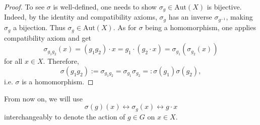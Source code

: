 \begin{proof}
To see $\sigma$ is well-defined, one needs to show $\sigma_g \in \mathrm{Aut}(X)$ is bijective. Indeed, 
    by the identity and compatibility axioms, $\sigma_g$ has an inverse $\sigma_{g^{-1}}$, making $\sigma_g$ a bijection. Thus $\sigma_g \in \mathrm{Aut}(X)$. As for $\sigma$ being a homomorphism, one applies compatibility axiom and get
    $$\sigma_{g_1 g_2}(x) = (g_1 g_2) \cdot x = g_1 \cdot (g_2 \cdot x) = \sigma_{g_1}(\sigma_{g_2}(x))$$
    for all $x \in X$. Therefore, 
    $$\sigma(g_1g_2) := \sigma_{g_1 g_2} = \sigma_{g_1}\sigma_{g_2} =: \sigma(g_1)\sigma(g_2),$$
    i.e. $\sigma$ is a homomorphism.
\end{proof}
From now on, we will use
$$\sigma(g)(x) \longleftrightarrow \sigma_g(x) \longleftrightarrow g \cdot x$$
interchangeably to denote the action of $g \in G$ on $x \in X$.
